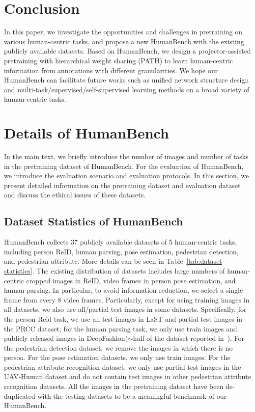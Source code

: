 \documentclass[10pt,twocolumn,letterpaper]{article}
\begin{document}
\section{Conclusion}
In this paper, we investigate the opportunities and challenges in pretraining on various human-centric tasks, and propose a new HumanBench with the existing publicly available datasets. Based on HumanBench, we design a projector-assisted pretraining with hierarchical weight sharing (PATH) to learn human-centric information from annotations with different granularities. We hope our HumanBench can facilitate future works such as unified network structure design and multi-task/supervised/self-supervised learning methods on a broad variety of human-centric tasks.

{\small


}

\clearpage
\appendix

\section{Details of HumanBench}
In the main text, we briefly introduce the number of images and number of tasks in the pretraining dataset of HumanBench. For the evaluation of HumanBench, we introduce the evaluation scenario and evaluation protocols. In this section, we present detailed information on the pretraining dataset and evaluation dataset and discuss the ethical issues of these datasets.
\subsection{Dataset Statistics of HumanBench}
HumanBench collects 37 publicly available datasets of 5 human-centric tasks, including person ReID, human parsing, pose estimation, pedestrian detection, and pedestrian attribute. More details can be seen in Table~\ref{tab:dataset statistics}.  The existing distribution of datasets includes large numbers of human-centric cropped images in ReID, video frames in person pose estimation, and human parsing. In particular, to avoid information reduction, we select a single frame from every 8 video frames. Particularly, except for using training images in all datasets, we also use all/partial test images in some datasets. Specifically, for the person Reid task, we use all test images in LaST and partial test images in the PRCC dataset; for the human parsing task, we only use train images and publicly released images in DeepFashion($\sim$half of the dataset reported in~\cite{liu2016deepfashion}). For the pedestrian detection dataset, we remove the images in which there is no person. For the pose estimation datasets, we only use train images. For the pedestrian attribute recognition dataset, we only use partial test images in the UAV-Human dataset and do not contain test images in other pedestrian attribute recognition datasets. All the images in the pretraining dataset have been de-duplicated with the testing datasets to be a meaningful benchmark of our HumanBench.
\end{document}
